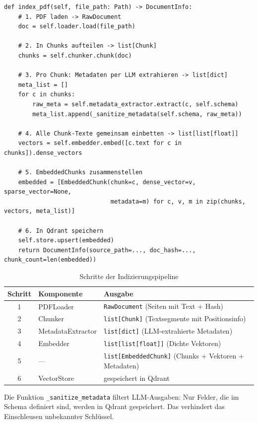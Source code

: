 \documentclass[12pt, a4paper]{article}
\begin{document}
\begin{lstlisting}[style=pythonstyle, caption={Indizierungs-Pipeline (indexer.py)}]
def index_pdf(self, file_path: Path) -> DocumentInfo:
    # 1. PDF laden -> RawDocument
    doc = self.loader.load(file_path)

    # 2. In Chunks aufteilen -> list[Chunk]
    chunks = self.chunker.chunk(doc)

    # 3. Pro Chunk: Metadaten per LLM extrahieren -> list[dict]
    meta_list = []
    for c in chunks:
        raw_meta = self.metadata_extractor.extract(c, self.schema)
        meta_list.append(_sanitize_metadata(self.schema, raw_meta))

    # 4. Alle Chunk-Texte gemeinsam einbetten -> list[list[float]]
    vectors = self.embedder.embed([c.text for c in chunks]).dense_vectors

    # 5. EmbeddedChunks zusammenstellen
    embedded = [EmbeddedChunk(chunk=c, dense_vector=v, sparse_vector=None,
                              metadata=m) for c, v, m in zip(chunks, vectors, meta_list)]

    # 6. In Qdrant speichern
    self.store.upsert(embedded)
    return DocumentInfo(source_path=..., doc_hash=..., chunk_count=len(embedded))
\end{lstlisting}

\begin{table}[H]
\centering
\small
\begin{tabularx}{\textwidth}{clX}
\toprule
\textbf{Schritt} & \textbf{Komponente} & \textbf{Ausgabe} \\
\midrule
1 & PDFLoader & \texttt{RawDocument} (Seiten mit Text + Hash) \\
2 & Chunker & \texttt{list[Chunk]} (Textsegmente mit Positionsinfo) \\
3 & MetadataExtractor & \texttt{list[dict]} (LLM-extrahierte Metadaten) \\
4 & Embedder & \texttt{list[list[float]]} (Dichte Vektoren) \\
5 & --- & \texttt{list[EmbeddedChunk]} (Chunks + Vektoren + Metadaten) \\
6 & VectorStore & gespeichert in Qdrant \\
\bottomrule
\end{tabularx}
\caption{Schritte der Indizierungspipeline}
\end{table}

Die Funktion \texttt{\_sanitize\_metadata} filtert LLM-Ausgaben: Nur Felder, die im
Schema definiert sind, werden in Qdrant gespeichert. Das verhindert das Einschleusen
unbekannter Schlüssel.
\end{document}
